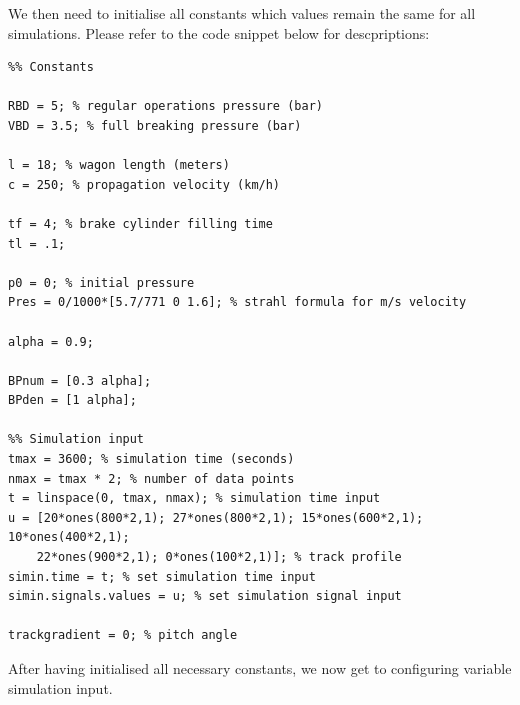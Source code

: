 \par\noindent
We then need to initialise all constants which values remain the same for all simulations. Please refer to the code snippet below for descpriptions:

\begin{lstlisting}
%% Constants

RBD = 5; % regular operations pressure (bar)
VBD = 3.5; % full breaking pressure (bar)

l = 18; % wagon length (meters)
c = 250; % propagation velocity (km/h)

tf = 4; % brake cylinder filling time
tl = .1; 

p0 = 0; % initial pressure
Pres = 0/1000*[5.7/771 0 1.6]; % strahl formula for m/s velocity

alpha = 0.9; 

BPnum = [0.3 alpha]; 
BPden = [1 alpha]; 

%% Simulation input
tmax = 3600; % simulation time (seconds)
nmax = tmax * 2; % number of data points
t = linspace(0, tmax, nmax); % simulation time input
u = [20*ones(800*2,1); 27*ones(800*2,1); 15*ones(600*2,1); 10*ones(400*2,1); 
	22*ones(900*2,1); 0*ones(100*2,1)]; % track profile
simin.time = t; % set simulation time input
simin.signals.values = u; % set simulation signal input

trackgradient = 0; % pitch angle
\end{lstlisting}

\par\noindent
After having initialised all necessary constants, we now get to configuring variable simulation input.

